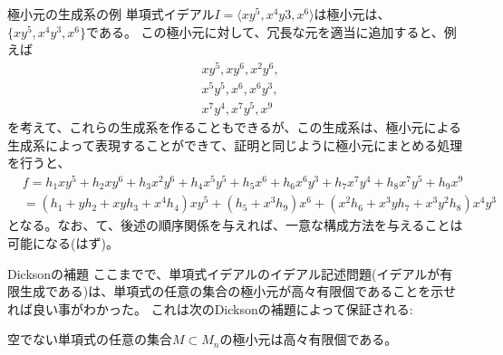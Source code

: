 \begin{frame}
\begin{exampleblock} {極小元の生成系の例}
単項式イデアル$I = \langle xy^5, x^4y3, x^6 \rangle$は極小元は、$\{xy^5, x^4y^3, x^6\}$である。
この極小元に対して、冗長な元を適当に追加すると、例えば
\begin{align*}
    & xy^5, xy^6, x^2y^6, \\
    & x^5y^5, x^6, x^6y^3, \\
    & x^7y^4, x^7y^5, x^9
\end{align*}
を考えて、これらの生成系を作ることもできるが、この生成系は、極小元による生成系によって表現することができて、証明と同じように極小元にまとめる処理を行うと、
\begin{align*}
    & f = h_1 xy^5 + h_2 xy^6 + h_3 x^2y^6 + h_4 x^5y^5 + h_5 x^6 + h_6 x^6y^3 + h_7 x^7y^4 + h_8 x^7 y^5 + h_9 x^9\\
    & = (h_1 + yh_2 + xy h_3 + x^4 h_4) xy^5 + (h_5 + x^3 h_9) x^6 + (x^2 h_6 + x^3 y h_7 + x^3y^2 h_8) x^4y^3
\end{align*}
となる。なお、て、後述の順序関係を与えれば、一意な構成方法を与えることは可能になる(はず)。
\end{exampleblock}
\end{frame}

\begin{frame} {Dicksonの補題}
ここまでで、単項式イデアルのイデアル記述問題(イデアルが有限生成である)は、単項式の任意の集合の極小元が高々有限個であることを示せれば良い事がわかった。
これは次のDicksonの補題によって保証される:
\begin{Theorem} [Dicksonの補題]
空でない単項式の任意の集合$M \subset M_n$の極小元は高々有限個である。
\end{Theorem}
\end{frame}
